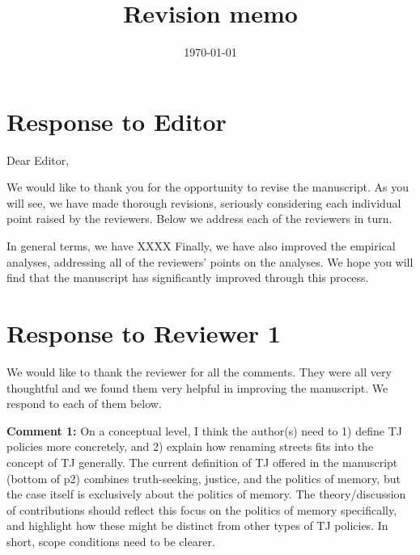 \documentclass[12pt, a4paper, notitlepage]{article}
\title{\Large \textbf{Revision memo}\\\vspace{10pt}{\large `Do TJ policies cause backlash? Evidence from street name changes in Spain', submitted to Research \& Politics (Manuscript ID RAP-21-0006)}}
\author{}
\date{\large \today}
\begin{document}
\maketitle

\section*{Response to Editor}

Dear Editor,

We would like to thank you for the opportunity to revise the manuscript. As you will see, we have made thorough revisions, seriously considering each individual point raised by the reviewers. Below we address each of the reviewers in turn. 

In general terms, we have  XXXX
Finally, we have also improved the empirical analyses, addressing all of the reviewers' points on the analyses. We hope you will find that the manuscript has significantly improved through this process.\\ [1ex]

\bigspace

\newpage

\section*{Response to Reviewer 1}

We would like to thank the reviewer for all the comments. They were all very thoughtful and we found them very helpful in improving the manuscript. We respond to each of them below.

\textbf{Comment 1:} On a conceptual level, I think the author(s) need to 1) define TJ policies more concretely, and 2) explain how renaming streets fits into the concept of TJ generally. The current definition of TJ offered in the manuscript (bottom of p2) combines truth-seeking, justice, and the politics of memory, but the case itself is exclusively about the politics of memory. The theory/discussion of contributions should reflect this focus on the politics of memory specifically, and highlight how these might be distinct from other types of TJ policies. In short, scope conditions need to be clearer.
\end{document}
